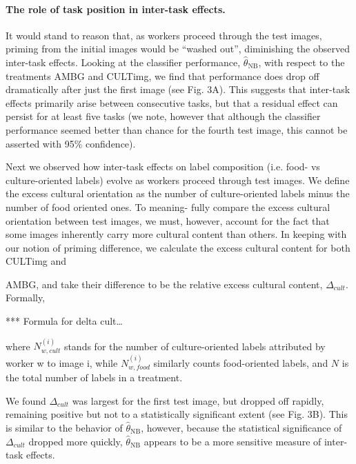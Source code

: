 \documentclass[12pt]{article}
\begin{document}
\paragraph{The role of task position in inter-task effects.}
It would stand to reason that, as workers proceed through the test images, 
priming from the initial images would be ``washed out'', diminishing the 
observed
inter-task effects. Looking at the classifier performance, 
$\hat{\theta}_\mathrm{NB}$, with respect to the treatments AMBG and CULTimg, 
we find that performance does drop off dramatically after just the first image 
(see Fig. 3A). This suggests that inter-task effects primarily arise between 
consecutive tasks, but that a residual effect can persist for at least five 
tasks (we note, however that although the classifier performance seemed better 
than chance for the fourth test image, this cannot be asserted with 95\% 
confidence).

Next we observed how inter-task effects on label composition (i.e. food- vs 
culture-oriented labels) evolve as workers proceed through test images. We 
define the excess cultural orientation as the number of culture-oriented 
labels minus the number of food oriented ones. To meaning- fully compare the 
excess cultural orientation between test images, we must, however, account 
for the fact that some images inherently carry more cultural content than 
others. In keeping with our notion of priming difference, we calculate the 
excess cultural content for both CULTimg and

AMBG, and take their difference to be the relative excess cultural content, 
$\Delta_{cult}$. Formally,

		*** Formula for delta cult\ldots

where $N^(i)_{w,cult}$ stands for the number of culture-oriented labels 
attributed by worker w to image i, while $N^(i)_{w,food}$ similarly counts
food-oriented labels, and $N$ is the total number of labels in a treatment.

We found $\Delta_{cult}$ was largest for the first test image, but dropped off 
rapidly, 
remaining positive but not to a statistically significant extent (see Fig. 3B).
This is similar to the behavior of $\hat{\theta}_\mathrm{NB}$, however, 
because the statistical significance of $\Delta_{cult}$ dropped more quickly, 
$\hat{\theta}_\mathrm{NB}$ appears to be a more sensitive measure of 
inter-task effects.
\end{document}
